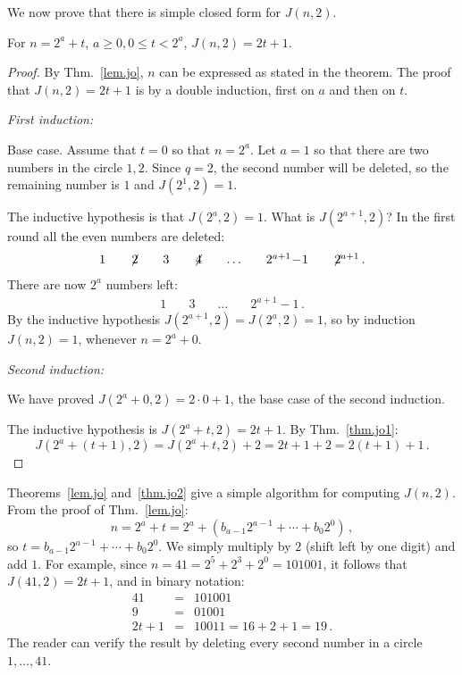 We now prove that there is simple closed form for $J(n,2)$. 
\begin{theorem}\label{thm.jo2}
For $n=2^a+t$, $a\geq 0, 0\leq t < 2^a$, $J(n,2)=2t+1$.
\end{theorem}

\begin{proof}
By Thm.~\ref{lem.jo}, $n$ can be expressed as stated in the theorem. The proof that $J(n,2)=2t+1$ is by a double induction, first on $a$ and then on $t$.

\textit{First induction:}

Base case. Assume that $t=0$ so that $n=2^a$. Let $a=1$ so that there are two numbers in the circle $1,2$. Since $q=2$, the second number will be deleted, so the remaining number is $1$ and $J(2^1,2)=1$.

The inductive hypothesis is that $J(2^a,2)=1$. What is $J(2^{a+1},2)$? In the first round all the even numbers are deleted:
\[
\begin{array}{rrrrrrrrrrrrrrrrrrrrrrrrrrrr}
1&\quad\not\! 2&\quad3&\quad\not\! 4& \quad\ldots&\quad 2^{a+1}\!-\!1&\quad \not\! 2^{a+1}\,.
\end{array}
\]
There are now $2^a$ numbers left:
\[
\begin{array}{rrrrrrrrrrrrrrrrrrrrrrrrrrrr}
1&\quad3&\quad\ldots&\quad 2^{a+1}\!-\!1\,.
\end{array}
\]
By the inductive hypothesis $J(2^{a+1},2)=J(2^a,2)=1$, so by induction $J(n,2)=1$, whenever $n=2^a+0$.

\textit{Second induction:}

We have proved $J(2^a+0,2)=2\cdot 0 +1$, the base case of the second induction.

The inductive hypothesis is $J(2^a+t,2)=2t+1$. By Thm.~\ref{thm.jo1}:
\[
J(2^a+(t+1),2)=J(2^a+t,2)+2=2t+1+2=2(t+1)+1\,.
\]
\end{proof}


Theorems~\ref{lem.jo} and~\ref{thm.jo2} give a simple algorithm for computing $J(n,2)$. From the proof of Thm.~\ref{lem.jo}:
\[
n=2^a+t=2^a+(b_{a-1}2^{a-1}+\cdots+b_{0}2^{0})\,,
\]
so $t=b_{a-1}2^{a-1}+\cdots+b_{0}2^{0}$. We simply multiply by $2$ (shift left by one digit) and add $1$. For example, since $n=41=2^5+2^3+2^0=101001$, it follows that $J(41,2)=2t+1$, and in binary notation:
\begin{eqnarray*}
41&=&101001\\
9&=&01001\\
2t+1&=&10011=16+2+1=19\,.
\end{eqnarray*}
The reader can verify the result by deleting every second number in a circle $1,\ldots,41$.

